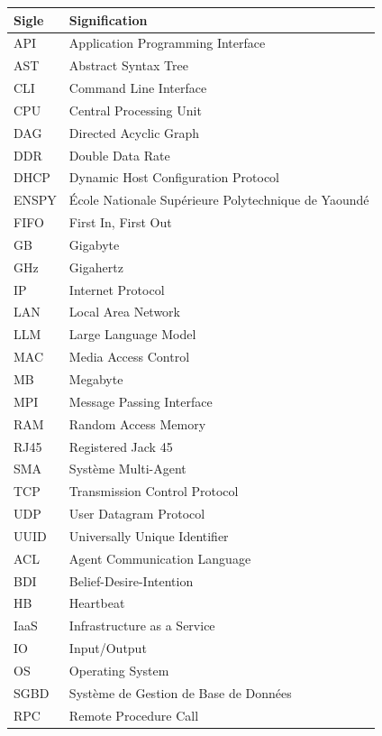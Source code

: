 \documentclass[12pt,a4paper]{report}
\begin{document}
\begin{table}[H]
\centering
\begin{tabular}{ll}
\toprule
\textbf{Sigle} & \textbf{Signification} \\
\midrule
API & Application Programming Interface \\
AST & Abstract Syntax Tree \\
CLI & Command Line Interface \\
CPU & Central Processing Unit \\
DAG & Directed Acyclic Graph \\
DDR & Double Data Rate \\
DHCP & Dynamic Host Configuration Protocol \\
ENSPY & École Nationale Supérieure Polytechnique de Yaoundé \\
FIFO & First In, First Out \\
GB & Gigabyte \\
GHz & Gigahertz \\
IP & Internet Protocol \\
LAN & Local Area Network \\
LLM & Large Language Model \\
MAC & Media Access Control \\
MB & Megabyte \\
MPI & Message Passing Interface \\
RAM & Random Access Memory \\
RJ45 & Registered Jack 45 \\
SMA & Système Multi-Agent \\
TCP & Transmission Control Protocol \\
UDP & User Datagram Protocol \\
UUID & Universally Unique Identifier \\
ACL & Agent Communication Language \\
BDI & Belief-Desire-Intention \\
HB & Heartbeat \\
IaaS & Infrastructure as a Service \\
IO & Input/Output \\
OS & Operating System \\
SGBD & Système de Gestion de Base de Données \\
RPC & Remote Procedure Call \\
\bottomrule
\end{tabular}
\end{table}
\end{document}
